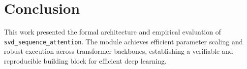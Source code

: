 \section{Conclusion}
This work presented the formal architecture and empirical evaluation of \texttt{svd_sequence_attention}. The module achieves efficient parameter scaling and robust execution across transformer backbones, establishing a verifiable and reproducible building block for efficient deep learning.
